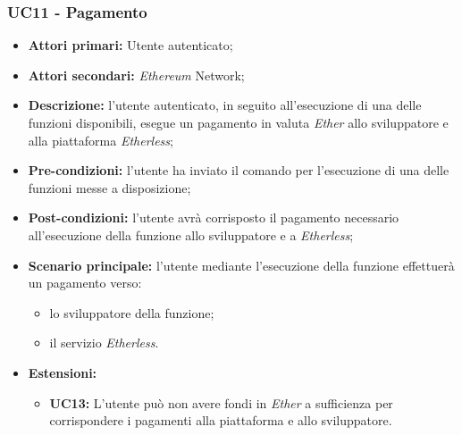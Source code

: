 \subsubsection{UC11 - Pagamento}
\begin{itemize}
	\item \textbf{Attori primari:} Utente autenticato;
	\item \textbf{Attori secondari:} \textit{Ethereum\glo} Network;
	\item \textbf{Descrizione:} l'utente autenticato, in seguito all'esecuzione di una delle funzioni disponibili, esegue un pagamento in valuta \textit{Ether\glo} allo sviluppatore e alla piattaforma \textit{Etherless}; 
	\item \textbf{Pre-condizioni:} l'utente ha inviato il comando per l'esecuzione di una delle funzioni messe a disposizione;
	\item \textbf{Post-condizioni:} l'utente avrà corrisposto il pagamento necessario all'esecuzione della funzione allo sviluppatore e a \textit{Etherless};
	\item \textbf{Scenario principale:} l'utente mediante l'esecuzione della funzione effettuerà un pagamento verso:
	\begin{itemize}
		\item lo sviluppatore della funzione;
		\item il servizio \textit{Etherless}.
	\end{itemize}
	\item \textbf{Estensioni:} 
	\begin{itemize}
		\item \textbf{UC13:} L'utente può non avere fondi in \textit{Ether\glo} a sufficienza per corrispondere i pagamenti alla piattaforma e allo sviluppatore.
	\end{itemize}
\end{itemize}